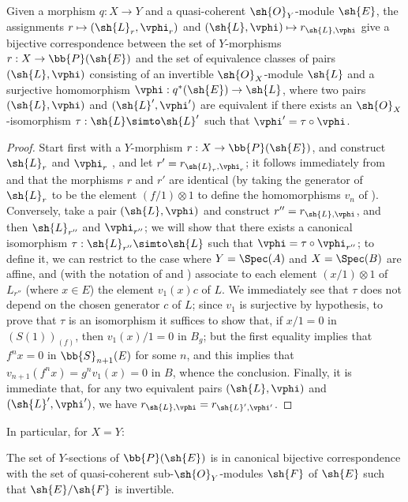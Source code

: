 \begin{proposition}[4.2.3]
\label{II.4.2.3}
Given a morphism $q:X\to Y$ and a quasi-coherent $\sh{O}_Y$-module $\sh{E}$, the assignments $r\mapsto(\sh{L}_r,\vphi_r)$ and $(\sh{L},\vphi)\mapsto r_{\sh{L},\vphi}$ give a bijective correspondence between the set of $Y$-morphisms $r:X\to\bb{P}(\sh{E})$ and the set of equivalence classes of pairs $(\sh{L},\vphi)$ consisting of an invertible $\sh{O}_X$-module $\sh{L}$ and a surjective homomorphism $\vphi:q^*(\sh{E})\to\sh{L}$, where two pairs $(\sh{L},\vphi)$ and $(\sh{L}',\vphi')$ are equivalent if there exists an $\sh{O}_X$-isomorphism $\tau:\sh{L}\simto\sh{L}'$ such that $\vphi'=\tau\circ\vphi$.
\end{proposition}

\begin{proof}
Start first with a $Y$-morphism $r:X\to\bb{P}(\sh{E})$, and construct $\sh{L}_r$ and $\vphi_r$ , and let $r'=r_{\sh{L}_r,\vphi_r}$;
it follows immediately from  and  that the morphisms $r$ and $r'$ are identical (by taking the generator of $\sh{L}_r$ to be the element $(f/1)\otimes1$ to define the homomorphisms $v_n$ of ).
Conversely, take a pair $(\sh{L},\vphi)$ and construct
$r''=r_{\sh{L},\vphi}$, and then $\sh{L}_{r''}$ and $\vphi_{r''}$;
we will show that there exists a canonical isomorphism $\tau:\sh{L}_{r''}\simto\sh{L}$ such that $\vphi=\tau\circ\vphi_{r''}$;
to define it, we can restrict to the case where $Y=\Spec(A)$ and $X=\Spec(B)$ are affine, and (with the notation of  and ) associate to each element $(x/1)\otimes1$ of $L_{r''}$ (where $x\in E$) the element $v_1(x)c$ of $L$.
We immediately see that $\tau$ does not depend on the chosen generator $c$ of $L$;
since $v_1$ is surjective by hypothesis, to prove that $\tau$ is an isomorphism it suffices to show that, if $x/1=0$ in $(S(1))_{(f)}$, then $v_1(x)/1=0$ in $B_g$;
but the first equality implies that $f^nx=0$ in $\bb{S}_{n+1}(E)$ for some $n$, and this implies that $v_{n+1}(f^nx) = g^nv_1(x) = 0$ in $B$, whence the conclusion.
Finally, it is immediate that, for any two equivalent pairs $(\sh{L},\vphi)$ and $(\sh{L}',\vphi')$, we have $r_{\sh{L},\vphi}=r_{\sh{L}',\vphi'}$.
\end{proof}

In particular, for $X=Y$:
\begin{theorem}[4.2.4]
\label{II.4.2.4}
The set of $Y$-sections of $\bb{P}(\sh{E})$ is in canonical bijective correspondence with the set of quasi-coherent sub-$\sh{O}_Y$-modules $\sh{F}$ of $\sh{E}$ such that $\sh{E}/\sh{F}$ is invertible.
\end{theorem}

